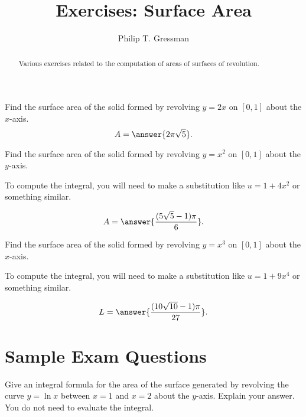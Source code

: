 \documentclass{ximera}
\title{Exercises: Surface Area}
\author{Philip T. Gressman}
\begin{document}
\begin{abstract}
Various exercises related to the computation of areas of surfaces of revolution.
\end{abstract}
\maketitle


\begin{exercise}%
Find the surface area of the solid formed by revolving \(y=2x\) on \([0,1]\) about the \(x\)-axis.
\[ A = \answer{2\pi\sqrt{5}}. \]
%
%
\end{exercise}

\begin{exercise}%
Find the surface area of the solid formed by revolving \(y=x^2\) on \([0,1]\) about the \(y\)-axis.
\begin{hint}
To compute the integral, you will need to make a substitution like $u = 1 + 4x^2$ or something similar.
\end{hint}
\[ A = \answer{\frac{(5 \sqrt{5} - 1) \pi}{6}}. \]
%
%
\end{exercise}

\begin{exercise}%
Find the surface area of the solid formed by revolving \(y=x^3\) on \([0,1]\) about the \(x\)-axis.
\begin{hint}
To compute the integral, you will need to make a substitution like $u = 1 + 9 x^4$ or something similar.
\end{hint}
\[ L = \answer{\frac{(10 \sqrt{10} - 1) \pi}{27}}. \]
%
%
\end{exercise}

\section*{Sample Exam Questions}

\begin{question}%
Give an integral formula for the area of the surface generated by revolving the curve $y = \ln x$ between $x=1$ and $x=2$ about the $y$-axis. Explain your answer. You do not need to evaluate the integral. 
\begin{multiplechoice}
\end{multiplechoice}
\end{question}
\end{document}
